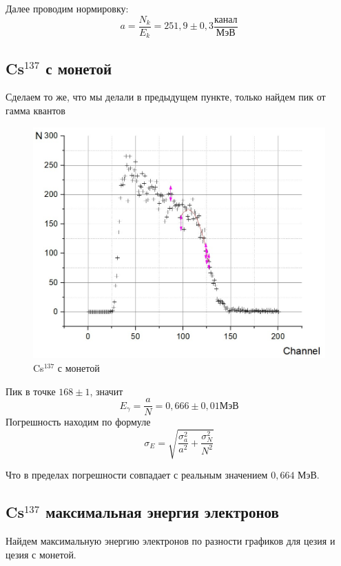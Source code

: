 \documentclass[a4paper, 12pt]{article}%
\begin{document}
Далее проводим нормировку:
\[a = \frac{N_k}{E_k} = 251,9 \pm 0,3 \frac{\text{канал}}{\text{МэВ}}\]
\newpage
\subsection*{Cs$^{137}$ с монетой}

Сделаем то же, что мы делали в предыдущем пункте, только найдем пик от гамма квантов

\begin{figure}[h]
\begin{center}
\includegraphics[width = \textwidth]{9.jpg}
\caption{Cs$^{137}$ с монетой}
\end{center}
\end{figure}
Пик в точке $168 \pm 1$, значит 
\[E_{\gamma} = \frac{a}{N} = 0,666 \pm 0,01 \text{МэВ}\]
Погрешность находим по формуле
\[\sigma_E = \sqrt{\frac{\sigma_a^2}{a^2} + \frac{\sigma_N^2}{N^2}}\]

Что в пределах погрешности совпадает с реальным значением $0,664$ МэВ.
\newpage
\subsection*{Cs$^{137}$ максимальная энергия электронов}
Найдем максимальную энергию электронов по разности графиков для цезия и цезия с монетой.
\end{document}
